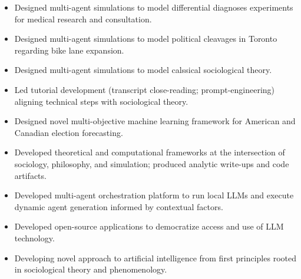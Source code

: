 \begin{itemize}
  \item Designed multi-agent simulations to model differential diagnoses experiments for medical research and consultation.
  \item Designed multi-agent simulations to model political cleavages in Toronto regarding bike lane expansion.
  \item Designed multi-agent simulations to model calssical sociological theory.
  \item Led tutorial development (transcript close-reading; prompt-engineering) aligning technical steps with sociological theory.
\end{itemize}

\begin{itemize}
    \item Designed novel multi-objective machine learning framework for American and Canadian election forecasting.
\end{itemize}
    
\begin{itemize}
  \item Developed theoretical and computational frameworks at the intersection of sociology, philosophy, and simulation; produced analytic write-ups and code artifacts.
\end{itemize}

\begin{itemize}
  \item Developed multi-agent orchestration platform to run local LLMs and execute dynamic agent generation informed by contextual factors.
  \item Developed open-source applications to democratize access and use of LLM technology.
  \item Developing novel approach to artificial intelligence from first principles rooted in sociological theory and phenomenology.
\end{itemize}
